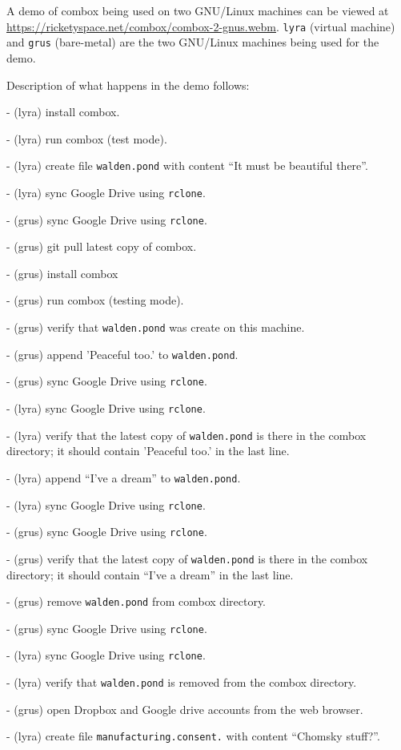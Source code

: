 A demo of combox being used on two GNU/Linux machines can be viewed at
\url{https://ricketyspace.net/combox/combox-2-gnus.webm}. \verb+lyra+
(virtual machine) and \verb+grus+ (bare-metal) are the two GNU/Linux
machines being used for the demo.

Description of what happens in the demo follows:

- (lyra) install combox.

- (lyra) run combox (test mode).

- (lyra) create file \verb+walden.pond+ with content ``It must be
beautiful there''.

- (lyra) sync Google Drive using \verb+rclone+.

- (grus) sync Google Drive using \verb+rclone+.

- (grus) git pull latest copy of combox.

- (grus) install combox

- (grus) run combox (testing mode).

- (grus) verify that \verb+walden.pond+ was create on this machine.

- (grus) append 'Peaceful too.' to \verb+walden.pond+.

- (grus) sync Google Drive using \verb+rclone+.

- (lyra) sync Google Drive using \verb+rclone+.

- (lyra) verify that the latest copy of \verb+walden.pond+ is there in
the combox directory; it should contain 'Peaceful too.' in the last
line.

- (lyra) append ``I've a dream'' to \verb+walden.pond+.

- (lyra) sync Google Drive using \verb+rclone+.

- (grus) sync Google Drive using \verb+rclone+.

- (grus) verify that the latest copy of \verb+walden.pond+ is there in
the combox directory; it should contain ``I've a dream'' in the last
line.

- (grus) remove \verb+walden.pond+ from combox directory.

- (grus) sync Google Drive using \verb+rclone+.

- (lyra) sync Google Drive using \verb+rclone+.

- (lyra) verify that \verb+walden.pond+ is removed from the combox
directory.

- (grus) open Dropbox and Google drive accounts from the web browser.

- (lyra) create file \verb+manufacturing.consent.+ with content
``Chomsky stuff?''.

